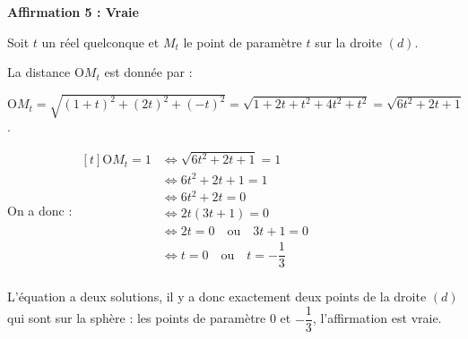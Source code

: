 \medskip


\textbf{Affirmation 5 : Vraie}

Soit $t$ un réel quelconque et $M_t$ le point de paramètre $t$ sur la droite $(d)$.

La distance $\mathrm{O}M_t$ est donnée par :

$\mathrm{O}M_t = \sqrt{(1 + t)^2 + (2t)^2 + (-t)^2} = \sqrt{1 + 2t + t^2 + 4t^2 + t^2} = \sqrt{6t^2 + 2t + 1} $.

On a donc : \quad $ \begin{aligned}[t] \mathrm{O}M_t = 1
	&\iff \sqrt{6t^2 + 2t + 1} = 1\\
	&\iff 6t^2 + 2t + 1 = 1 \\%
	&\iff 6t^2 + 2t = 0\\
	&\iff 2t(3t + 1) = 0\\
	&\iff 2t = 0 \quad \text{ou} \quad 3t + 1 = 0\\
	&\iff t = 0 \quad \text{ou} \quad t = -\dfrac{1}{3}\\
\end{aligned} $

L'équation a deux solutions, il y a donc exactement deux points de la droite $(d)$ qui sont sur la sphère : les points de paramètre 0 et $ -\dfrac{1}{3} $, l'affirmation est vraie.
\medskip
